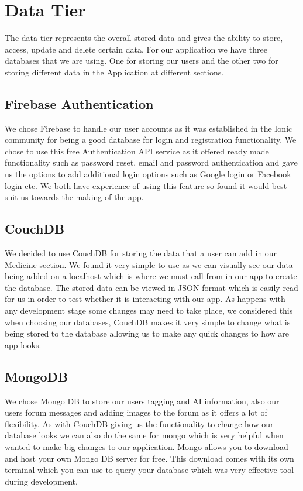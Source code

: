 \documentclass[12pt,a4paper,oneside,openany]{book}
\begin{document}
\section{Data Tier}
The data tier represents the overall stored data and gives the ability to store, access, update and delete certain data. For our application we have three databases that we are using. One for storing our users and the other two for storing different data in the Application at different sections.

\subsection{Firebase Authentication}
We chose Firebase to handle our user accounts as it was established in the Ionic community for being a good database for login and registration functionality. We chose to use this free Authentication API service as it offered ready made functionality such as password reset, email and password authentication and gave us the options to add additional login options such as Google login or Facebook login etc. We both have experience of using this feature so found it would best suit us towards the making of the app. \cite{Firebase}

\subsection{CouchDB}
We decided to use CouchDB for storing the data that a user can add in our Medicine section. We found it very simple to use as we can visually see our data being added on a localhost which is where we must call from in our app to create the database. The stored data can be viewed in JSON format which is easily read for us in order to test whether it is interacting with our app. As happens with any development stage some changes may need to take place, we considered this when choosing our databases, CouchDB makes it very simple to change what is being stored to the database allowing us to make any quick changes to how are app looks.\cite{CouchDB}

\subsection{MongoDB}
We chose Mongo DB to store our users tagging and AI information, also our users forum messages and adding images to the forum as it offers a lot of flexibility. As with CouchDB giving us the functionality to change how our database looks we can also do the same for mongo which is very helpful when wanted to make big changes to our application. Mongo allows you to download and host your own Mongo DB server for free. This download comes with its own terminal which you can use to query your database which was very effective tool during development.\cite{MongoDB}
\end{document}
